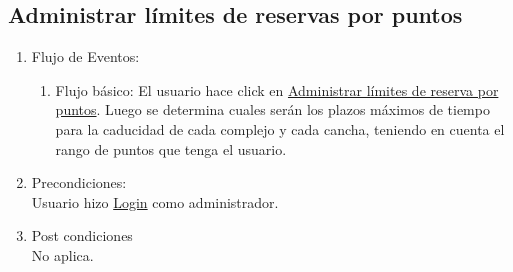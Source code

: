 \documentclass[a4paper,11pt]{article}
\begin{document}

\subsection{Administrar límites de reservas por puntos}
\begin{enumerate}


    \begin{enumerate}
    \item Descripción breve: \\
        Este caso de uso describe como se definen los plazos de vencimiento de
        las reservas según el puntaje del usuario que haya realizado la reserva.
    \item Actores \\
        Administrador.
    \item Disparadores: \\
        El administrador hace click en 
        \underline{Administrar límites de reserva por puntos}
        dentro de su panel de administración.
    \end{enumerate}

    \item Flujo de Eventos: 

    \begin{enumerate}

        \item Flujo básico:
            El usuario hace click en \underline{Administrar límites de reserva
            por puntos}.
            Luego se determina cuales serán los plazos máximos de tiempo para la
            caducidad de cada complejo y cada cancha, teniendo en cuenta el rango
            de puntos que tenga el usuario.
    \end{enumerate}

    \item Precondiciones: \\
        Usuario hizo \underline{Login} como administrador.

    \item Post condiciones \\
        No aplica.
        
\end{enumerate}

\end{document}
